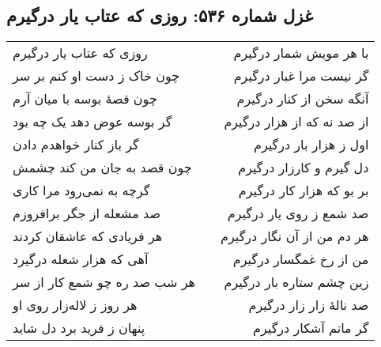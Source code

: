 \begin{center}
\section*{غزل شماره ۵۳۶: روزی که عتاب یار درگیرم}
\label{sec:536}
\begin{longtable}{l p{0.5cm} r}
روزی که عتاب یار درگیرم
&&
با هر مویش شمار درگیرم
\\
چون خاک ز دست او کنم بر سر
&&
گر نیست مرا غبار درگیرم
\\
چون قصهٔ بوسه با میان آرم
&&
آنگه سخن از کنار درگیرم
\\
گر بوسه عوض دهد یک چه بود
&&
از صد نه که از هزار درگیرم
\\
گر باز کنار خواهدم دادن
&&
اول ز هزار بار درگیرم
\\
چون قصد به جان من کند چشمش
&&
دل گیرم و کارزار درگیرم
\\
گرچه به نمی‌رود مرا کاری
&&
بر بو که هزار کار درگیرم
\\
صد مشعله از جگر برافروزم
&&
صد شمع ز روی یار درگیرم
\\
هر فریادی که عاشقان کردند
&&
هر دم من از آن نگار درگیرم
\\
آهی که هزار شعله درگیرد
&&
من از رخ غمگسار درگیرم
\\
هر شب صد ره چو شمع کار از سر
&&
زین چشم ستاره بار درگیرم
\\
هر روز ز لاله‌زار روی او
&&
صد نالهٔ زار زار درگیرم
\\
پنهان ز فرید برد دل شاید
&&
گر ماتم آشکار درگیرم
\\
\end{longtable}
\end{center}
